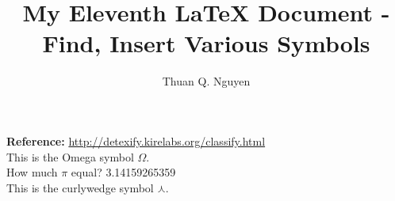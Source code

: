 \documentclass{article}
\begin{document}
\title{My Eleventh \LaTeX{} Document - Find, Insert Various Symbols}
\author{Thuan Q. Nguyen}
\maketitle


\textbf{Reference:} \url{http://detexify.kirelabs.org/classify.html} \\

This is the Omega symbol $\Omega$. \\

How much $\pi$ equal? 3.14159265359 \\

This is the curlywedge symbol $\curlywedge$.
\end{document}
